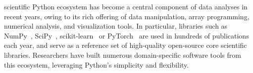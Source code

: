 \documentclass[10pt,journal,compsoc]{IEEEtran}
\begin{document}
\IEEEdisplaynontitleabstractindextext



%
\IEEEpeerreviewmaketitle




 scientific Python ecosystem has become a central component
of data analyses in recent years, owing to its rich offering of data
manipulation, array programming, numerical analysis, and visualization tools. In
particular, libraries such as NumPy~\cite{harris2020array},
SciPy~\cite{virtanen2020scipy}, scikit-learn~\cite{pedregosa2011scikit} or
PyTorch~\cite{paszke2019pytorch} are used in hundreds of publications each year,
and serve as a reference set of high-quality open-source core scientific
libraries. Researchers have built numerous domain-specific software tools from
this ecosystem, leveraging Python's simplicity and flexibility.
\end{document}
